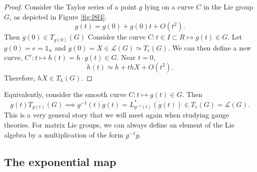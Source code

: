 \begin{proof}
  Consider the Taylor series of a point $g$ lying on a curve $C$ in the Lie group $G$, as depicted in Figure \ref{fig:l8f4}.
  \begin{equation}
    g(t) = g(0) + \dot g(0) t + O(t^2).
  \end{equation}
  Then $\dot g(0) \in T_{g(0)}(G)$
  Consider the curve $C\colon t \in I \subset R \mapsto g(t) \in G$. Let $g(0) = e = \mathbb{1}_n$ and $\dot g(0) = X \in \mathscr{L}(G) \simeq T_e(G)$.
  We can then define a new curve, $C' \colon t \mapsto h(t) = h \cdot g(t) \in G$. Near $t=0$,
  \begin{equation}
    h(t) \simeq h + t hX + O(t^2).
  \end{equation}
  Therefore, $hX \in T_h(G)$.
\end{proof}

Equivalently, consider the smooth curve $C \colon t \mapsto g(t) \in G$. Then
\begin{equation}
  \dot g(t) T_{g(t)}(G) \implies g^{-1}(t) \dot g(t) = L^*_{g^{-1}(t)} (\dot g(t)) \in T_e(G) = \mathscr{L}(G).
\end{equation}
This is a very general story that we will meet again when studying gauge theories.
For matrix Lie groups, we can always define an element of the Lie algebra by a multiplication of the form $g^{-1} \dot g$.

\subsection{The exponential map}%
\label{sub:the_exponential_map}

